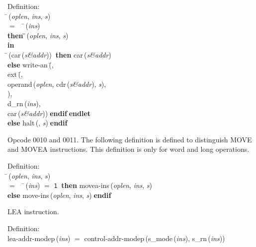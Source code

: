\begin{tabbing}{\sc Definition}: \\  
\=\,({\it{oplen\/}}, {\it{ins\/}}, {\it{s\/}}) \\ 
$=$$\;\;\;\;$\=\,({\it{ins\/}}) \\ 
{\bf then }\=\=\,({\it{oplen\/}}, {\it{ins\/}}, {\it{s\/}})\- \\ 
{\bf in} \\ 
\=\,({\rm{car}}\,({\it{s\&addr\/}}))$\;\;${\bf then }{\rm{car}}\,({\it{s\&addr\/}}) \\ 
{\bf else }{\rm{write-an}}\,(\=, \\ 
{\rm{ext}}\,(\=, \\ 
{\rm{operand}}\,({\it{oplen\/}}, {\rm{cdr}}\,({\it{s\&addr\/}}), {\it{s\/}}), \\ 
{})\-, \\ 
{\rm{d\_rn}}\,({\it{ins\/}}), \\ 
{\rm{car}}\,({\it{s\&addr\/}}))\-$\;${\bf  endif}\-$\;${\bf  endlet}\- \\ 
{\bf else }{\rm{halt}}\,({}, {\it{s\/}})$\;${\bf  endif}\-\-
\end{tabbing}

 Opcode 0010 and 0011.
 The following definition is defined to distinguish MOVE and MOVEA
 instructions.  This definition is only for word and long operations.
\begin{tabbing}{\sc Definition}: \\  
\=\,({\it{oplen\/}}, {\it{ins\/}}, {\it{s\/}}) \\ 
$=$$\;\;\;\;$\=\,({\it{ins\/}}) $=$ {\tt{1}}$\;\;${\bf then }{\rm{movea-ins}}\,({\it{oplen\/}}, {\it{ins\/}}, {\it{s\/}}) \\ 
{\bf else }{\rm{move-ins}}\,({\it{oplen\/}}, {\it{ins\/}}, {\it{s\/}})$\;${\bf  endif}\-\-
\end{tabbing}

 LEA instruction.
\begin{tabbing}{\sc Definition}: \\  
{\rm{lea-addr-modep}}\,({\it{ins\/}}) $=$ {\rm{control-addr-modep}}\,({\rm{s\_mode}}\,({\it{ins\/}}), {\rm{s\_rn}}\,({\it{ins\/}}))
\end{tabbing}

